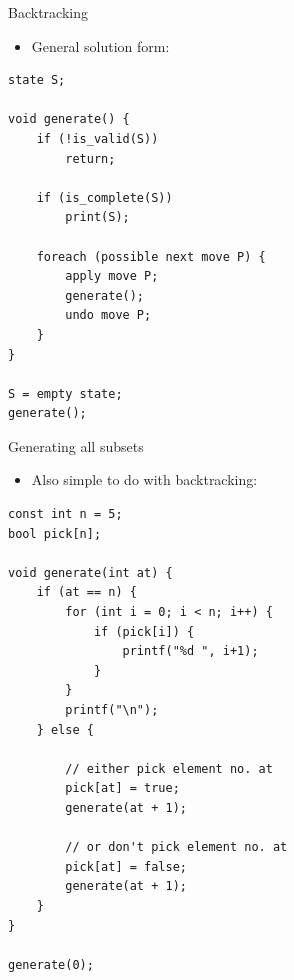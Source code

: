 \documentclass{beamer}
\begin{document}
\begin{frame}{Backtracking}
    \begin{itemize}
        \item General solution form:
    \end{itemize}

    \begin{verbatim}
state S;

void generate() {
    if (!is_valid(S))
        return;

    if (is_complete(S))
        print(S);

    foreach (possible next move P) {
        apply move P;
        generate();
        undo move P;
    }
}

S = empty state;
generate();
    \end{verbatim}
\end{frame}


\begin{frame}{Generating all subsets}
    \begin{itemize}
        \item Also simple to do with backtracking:
    \end{itemize}
    \begin{verbatim}
const int n = 5;
bool pick[n];

void generate(int at) {
    if (at == n) {
        for (int i = 0; i < n; i++) {
            if (pick[i]) {
                printf("%d ", i+1);
            }
        }
        printf("\n");
    } else {

        // either pick element no. at
        pick[at] = true;
        generate(at + 1);

        // or don't pick element no. at
        pick[at] = false;
        generate(at + 1);
    }
}

generate(0);
    \end{verbatim}
\end{frame}
\end{document}
